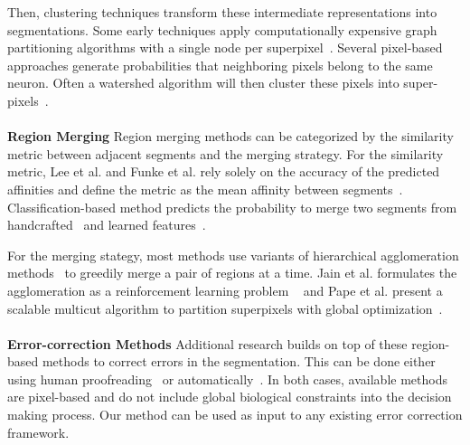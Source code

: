 Then, clustering techniques transform these intermediate representations into segmentations.
Some early techniques apply computationally expensive graph partitioning algorithms with a single node per superpixel~\cite{andres2012globally}.
Several pixel-based approaches generate probabilities that neighboring pixels belong to the same neuron.
Often a watershed algorithm will then cluster these pixels into super-pixels~\cite{zlateski2015image}.
\\~\\
\noindent\textbf{Region Merging}
Region merging methods can be categorized by the similarity metric between adjacent segments and the merging strategy.
For the similarity metric, Lee et al. and Funke et al. rely solely on the accuracy of the predicted affinities and define the metric as the mean affinity between segments~\cite{lee2017superhuman,funke2017deep}.
Classification-based method predicts the probability to merge two segments from handcrafted~\cite{seymour2016rhoananet,nunez2014graph,parag2017anisotropic,zlateski2015image,10.1371/journal.pone.0125825,jain2011learning} and learned features~\cite{bogovic2013learned}. 

For the merging stategy, most methods use variants of hierarchical agglomeration methods~\cite{seymour2016rhoananet,nunez2014graph,parag2017anisotropic,zlateski2015image,10.1371/journal.pone.0125825} to greedily merge a pair of regions at a time.
Jain et al. formulates the agglomeration as a reinforcement learning problem ~\cite{jain2011learning} and Pape et al. present a scalable multicut algorithm to partition superpixels with global optimization~\cite{beier2017multicut}.
\\~\\
\noindent\textbf{Error-correction Methods}
 Additional research builds on top of these region-based methods to correct errors in the segmentation. This can be done either using human proofreading~\cite{haehn2014design,haehn2017guided,mojo2} or automatically~\cite{rolnick2017morphological,error_correction_using_CNN}. In both cases, available methods are pixel-based and do not include global biological constraints into the decision making process. Our method can be used as input to any existing error correction framework.




